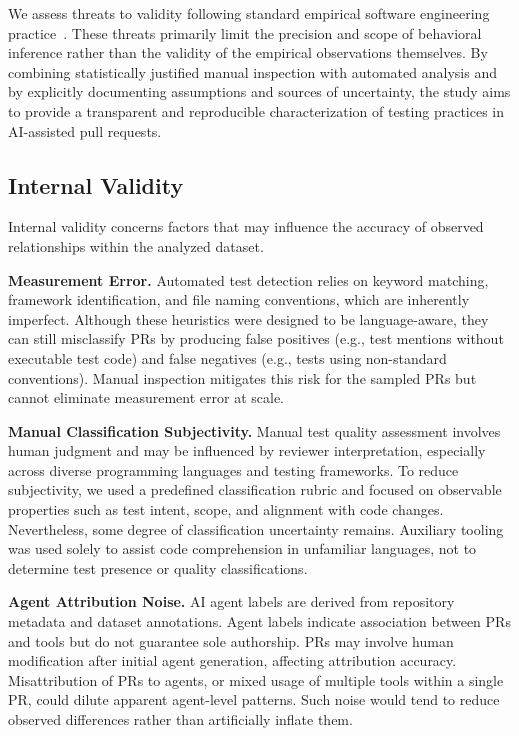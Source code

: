 \documentclass[conference]{IEEEtran}
\begin{document}
We assess threats to validity following standard empirical software engineering practice~\cite{wohlin2012experimentation, kitchenham2002preliminary}. These threats primarily limit the precision and scope of behavioral inference rather than the validity of the empirical observations themselves. By combining statistically justified manual inspection with automated analysis and by explicitly documenting assumptions and sources of uncertainty, the study aims to provide a transparent and reproducible characterization of testing practices in AI-assisted pull requests.

\subsection{Internal Validity}

Internal validity concerns factors that may influence the accuracy of observed relationships within the analyzed dataset.

\textbf{Measurement Error.} Automated test detection relies on keyword matching, framework identification, and file naming conventions, which are inherently imperfect. Although these heuristics were designed to be language-aware, they can still misclassify PRs by producing false positives (e.g., test mentions without executable test code) and false negatives (e.g., tests using non-standard conventions). Manual inspection mitigates this risk for the sampled PRs but cannot eliminate measurement error at scale.

\textbf{Manual Classification Subjectivity.} Manual test quality assessment involves human judgment and may be influenced by reviewer interpretation, especially across diverse programming languages and testing frameworks. To reduce subjectivity, we used a predefined classification rubric and focused on observable properties such as test intent, scope, and alignment with code changes. Nevertheless, some degree of classification uncertainty remains. Auxiliary tooling was used solely to assist code comprehension in unfamiliar languages, not to determine test presence or quality classifications.

\textbf{Agent Attribution Noise.} AI agent labels are derived from repository metadata and dataset annotations. Agent labels indicate association between PRs and tools but do not guarantee sole authorship. PRs may involve human modification after initial agent generation, affecting attribution accuracy. Misattribution of PRs to agents, or mixed usage of multiple tools within a single PR, could dilute apparent agent-level patterns. Such noise would tend to reduce observed differences rather than artificially inflate them.
\end{document}
